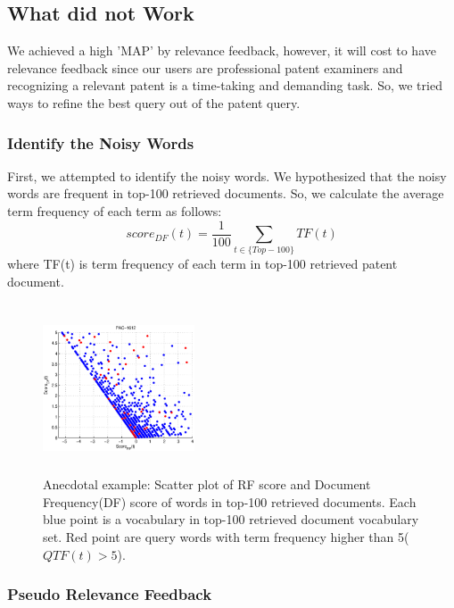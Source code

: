 \documentclass{sig-alternate}
\begin{document}
\subsection{What did not Work}
We achieved a high 'MAP' by relevance feedback, however, it will cost to have relevance feedback since our users are professional patent examiners and recognizing a relevant patent is a time-taking and demanding task. So, we tried ways to refine the best query out of the patent query. 
\subsubsection{Identify the Noisy Words}
First, we attempted to identify the noisy words. We hypothesized that the noisy words are frequent in top-100 retrieved documents. So, we calculate the average term frequency of each term as follows:
\begin{equation}
score_{DF}(t)= \frac{1}{100}\sum_{t\in \lbrace Top-100\rbrace} TF(t)  
 \label{eq:dfscore}
\end{equation}
where TF(t) is term frequency of each term in top-100 retrieved patent document.
\begin{figure}[htpb]
   \centering
   \includegraphics[width=0.40\textwidth,height=50mm]{figs/front.eps}
   \caption{Anecdotal example: Scatter plot of RF score and Document Frequency(DF) score of words in top-100 retrieved documents. Each blue point is a vocabulary in top-100 retrieved document vocabulary set. Red point are query words with term frequency higher than 5($ QTF(t)>5 $).}   
   \label{fig:dfrf} 
\end{figure}

\subsubsection{Pseudo Relevance Feedback}
\end{document}
